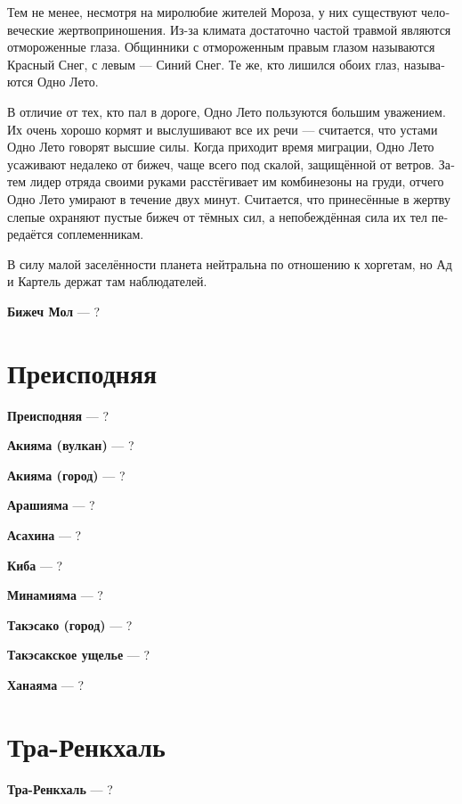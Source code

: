 \documentclass[a4paper,12pt,fleqn]{book}\usepackage{polyglossia}\setdefaultlanguage[babelshorthands=true]{russian}\setotherlanguage{english}\defaultfontfeatures{Ligatures=TeX,Mapping=tex-text}\usepackage{xcolor}\newcommand{\ml}[3]{#2}
\newcommand{\asterism}{\vspace{1em}{\centering\Large\bfseries$\ast~\ast~\ast$\par}\vspace{1em}}
\newcommand{\theterm}[3]{\textbf{\hypertarget{#1}{#2}} --- #3}
\begin{document}
{Тем не менее, несмотря на миролюбие жителей Мороза, у них существуют человеческие жертвоприношения.
Из-за климата достаточно частой травмой являются отмороженные глаза.
Общинники с отмороженным правым глазом называются Красный Снег, с левым --- Синий Снег.
Те же, кто лишился обоих глаз, называются Одно Лето.

В отличие от тех, кто пал в дороге, Одно Лето пользуются большим уважением.
Их очень хорошо кормят и выслушивают все их речи --- считается, что устами Одно Лето говорят высшие силы.
Когда приходит время миграции, Одно Лето усаживают недалеко от бижеч, чаще всего под скалой, защищённой от ветров.
Затем лидер отряда своими руками расстёгивает им комбинезоны на груди, отчего Одно Лето умирают в течение двух минут.
Считается, что принесённые в жертву слепые охраняют пустые бижеч от тёмных сил, а непобеждённая сила их тел передаётся соплеменникам.

В силу малой заселённости планета нейтральна по отношению к хоргетам, но Ад и Картель держат там наблюдателей.}

\asterism

\theterm{bizec-mol}
{Бижеч Мол}
{?}

\section{Преисподняя}

\theterm{netherworld}
{Преисподняя}
{?}

\asterism

\theterm{akiyama-volcano}
{Акияма (вулкан)}
{?}

\theterm{akiyama-town}
{Акияма (город)}
{?}

\theterm{arashiyama}
{Арашияма}
{?}

\theterm{asahina}
{Асахина}
{?}

\theterm{kiba}
{Киба}
{?}

\theterm{minamiyama}
{Минамияма}
{?}

\theterm{takesako-city}
{Такэсако (город)}
{?}

\theterm{takesako-dale}
{Такэсакское ущелье}
{?}

\theterm{hanayama}
{Ханаяма}
{?}

\section{Тра-Ренкхаль}

\theterm{tra-renkchal}
{Тра-Ренкхаль}
{?}
\end{document}

